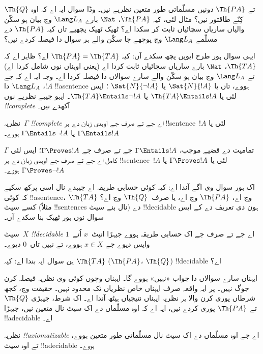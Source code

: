 \documentclass[../../../include/open-logic-section]{subfiles}
\begin{document}
$\Th{Q}$ تے $\Th{PA}$
دونیں مسلّماتی طور
متعین نظریے نیں۔
وڈا سوال ایہ اے
کہ اوہ کِنّے طاقتور
نیں؟ مثال لئی،
کیہ $\Th{PA}$،
$\Nat$ بارے
$\Lang L_A$ وچ
بیان ہو سکّن
والیاں ساریاں
سچائیاں ثابت کر
سکدا اے؟ ٹھیک
ٹھیک پچھیے تاں
کیہ $\Th{PA}$
دے مسلّمے
$\Lang L_A$ وچ
پوچھے جا سکّن
والے ہر سوال
دا فیصلہ کردے
نیں؟

ایہی سوال ہور
طرح ایویں پچھ
سکدے آں: کیہ
$\Th{PA} = \Th{TA}$
اے؟ ظاہر اے کہ
$\Th{TA}$،
$\Nat$ بارے
ساریاں سچائیاں
ثابت کردا اے
(یعنی اوہناں
نوں شامل کردا
اے) تے
$\Lang L_A$
وچ بیان ہو
سکّن والے
سارے سوالاں
دا فیصلہ کردا
اے۔ وجہ ایہ
اے کہ جے
$!A$،
$\Lang L_A$
دا !!a{sentence}
ہووے، تاں یا
$\Sat{N}{!A}$
یا
$\Sat{N}{\lnot !A}$
؛ ایس لئی
یا
$\Th{TA} \Entails !A$
یا
$\Th{TA} \Entails \lnot !A$۔
ایہو جیہے
نظریے نوں
\emph{!!{complete}}
آکھدے نیں۔

\begin{defn}
نظریہ~$\Gamma$
\emph{!!{complete}}
اے جے تے صرف
جے اوہدی زبان
دے ہر
!!{sentence}~$!A$
لئی یا
$\Gamma \Entails !A$
یا
$\Gamma \Entails \lnot !A$
ہووے۔
\end{defn}

\begin{explain}
تمامیت دے قضیے
موجب،
$\Gamma \Entails !A$
جے تے صرف جے
$\Gamma \Proves
!A$؛ ایس لئی
$\Gamma$ کامل
اے جے تے
صرف جے اوہدی
زبان دے ہر
!!{sentence}~$!A$
لئی یا
$\Gamma \Proves !A$
یا
$\Gamma \Proves \lnot !A$
ہووے۔
\end{explain}

اک ہور سوال وی
اگے آندا اے:
کیہ کوئی حسابی
طریقہ اے جیہدے
نال اسی پرکھ
سکیے کہ کوئی
!!a{sentence}،
$\Th{TA}$ وچ
اے، $\Th{PA}$
وچ اے، یا
صرف~$\Th{Q}$
وچ اے؟
کسے سیٹ
(مثلاً
!!{sentence}s نال بنے سیٹ)
دے !!{decidable}
ہون دی تعریف
دے کے ایس
سوال نوں ہور
ٹھیک بنا
سکدے آں۔

\begin{defn}
سیٹ~$X$
\emph{!!{decidable}}
اے جے تے
صرف جے اک
حسابی طریقہ
ہووے جیہڑا
انپٹ~$x$
اُتے~$1$
واپس دیوے
جے $x \in X$
ہووے، تے نہیں
تاں~$0$ دیوے۔
\end{defn}

ہن سوال ایہ
بندا اے:
کیہ $\Th{TA}$
($\Th{PA}$،
$\Th{Q}$)
!!{decidable}
اے؟

ایہناں سارے
سوالاں دا
جواب «نہیں»
ہووے گا۔
ایہناں وچوں
کوئی وی نظریہ
فیصلہ کرن جوگ
نہیں۔ پر ایہ
واقعہ صرف ایہناں
خاص نظریاں
تک محدود نہیں۔
حقیقت وچ،
کجھ شرطاں
پوری کرن والا
\emph{ہر}
نظریہ ایہناں
نتیجیاں ہیٹھ
آندا اے۔ اک
شرط، جیہڑی
$\Th{Q}$ تے
$\Th{PA}$ پوری
کردے نیں،
ایہ اے کہ
اوہ مسلّماں
دے اک سیٹ نال
متعین نیں،
جیہڑا !!a{decidable}
اے۔

\begin{defn}
نظریہ
\emph{!!{axiomatizable}} اے جے اوہ
مسلّماں دے اک سیٹ نال
مسلّماتی طور متعین ہووے،
تے اوہ سیٹ !!a{decidable} ہووے۔
\end{defn}
\end{document}

